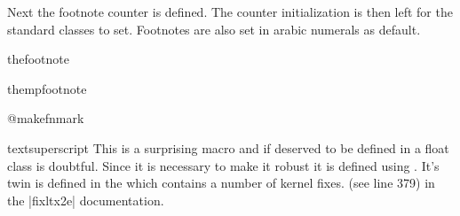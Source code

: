 Next the footnote counter is defined. The counter initialization is then left for the standard
classes to set. Footnotes are also set in arabic numerals as default.

 \begin{docCommand}{thefootnote}{}
    \begin{teX}
\def\thefootnote{\@arabic\c@footnote}
    \end{teX}
 \end{docCommand}

 \begin{docCommand}{thempfootnote}{}
    \begin{teX}
\def\thempfootnote{{\itshape\@alph\c@mpfootnote}}
    \end{teX}
 \end{docCommand}
%
 \begin{docCommand}{@makefnmark}{}
    \begin{teX}
\def\@makefnmark{\hbox{\@textsuperscript{\normalfont\@thefnmark}}}
    \end{teX}
 \end{docCommand}
%

 \begin{docCommand}{textsuperscript} {}
This is a surprising macro and if  deserved to be defined
in a float class is doubtful. Since it is necessary to make it robust it
is defined using \cmd{\DeclareRobustCommand}. It’s twin is defined in the
 which contains a number of kernel fixes. (see line 379) in the |fixltx2e| 
documentation. 
%
    \begin{teX}
\DeclareRobustCommand*\textsuperscript[1]{%
  \@textsuperscript{\selectfont#1}}
    \end{teX}
  \end{docCommand}

